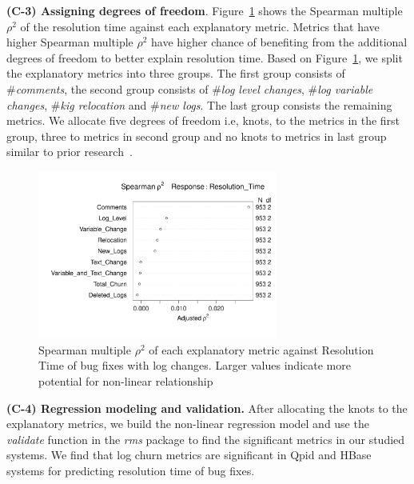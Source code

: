 \textbf{(C-3) Assigning degrees of freedom}. Figure~\ref{fig:Spearman} shows the Spearman multiple $\rho^{2}$ of the resolution time against each explanatory metric. Metrics that have higher Spearman multiple $\rho^{2}$ have higher chance of benefiting from the additional degrees of freedom to better explain resolution time. Based on Figure~\ref{fig:Spearman}, we split the explanatory metrics into three groups. The first group consists of \#\textsl{comments}, the second group consists of \#\textsl{log level changes}, \#\textsl{log variable changes}, \#\textsl{kig relocation} and \#\textsl{new logs}. The last group consists the remaining metrics. We allocate five degrees of freedom i.e, knots, to the metrics in the first group, three to metrics in second group and no knots to metrics in last group similar to prior research~\cite{ShaneOLS}.


\begin{figure}[t]
	\begin{minipage}[b]{1\columnwidth}
			\centering 
		\hspace*{-2cm}	\includegraphics[width=0.7\textwidth]{QpidDF}	
		
	\end{minipage}
	\captionsetup{labelsep = colon}
	\hspace*{1.7cm}\caption{Spearman multiple $\rho^{2}$ of each explanatory metric against Resolution Time of bug fixes with log changes. Larger values indicate more potential for non-linear relationship \label{fig:Spearman}}
\end{figure}




\textbf{(C-4) Regression modeling and validation.} After allocating the knots to the explanatory metrics, we build the non-linear regression model and use the \textsl{validate} function in the \textsl{rms} package to find the significant metrics in our studied systems. We find that log churn metrics are significant in Qpid and HBase systems for predicting resolution time of bug fixes. 

